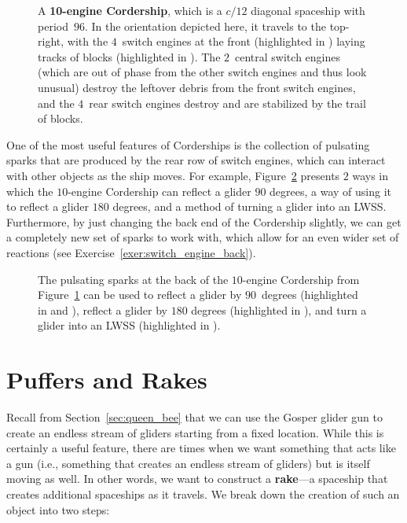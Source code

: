 \begin{figure}[!htb]
	\centering{}
	\caption{A \textbf{10-engine Cordership}, which is a $c/12$ diagonal spaceship with period~$96$. In the orientation depicted here, it travels to the top-right, with the $4$~switch engines at the front (highlighted in ) laying tracks of blocks (highlighted in ). The $2$~central switch engines (which are out of phase from the other switch engines and thus look unusual) destroy the leftover debris from the front switch engines, and the $4$~rear switch engines destroy and are stabilized by the trail of blocks.}\label{fig:10_engine_cordership}
\end{figure}

One of the most useful features of Corderships is the collection of pulsating sparks that are produced by the rear row of switch engines, which can interact with other objects as the ship moves. For example, Figure~\ref{fig:cordership_reflections} presents $2$ ways in which the $10$-engine Cordership can reflect a glider $90$ degrees, a way of using it to reflect a glider $180$ degrees, and a method of turning a glider into an LWSS. Furthermore, by just changing the back end of the Cordership slightly, we can get a completely new set of sparks to work with, which allow for an even wider set of reactions (see Exercise~\ref{exer:switch_engine_back}).

\begin{figure}[!htb]
	\centering{}
	\caption{The pulsating sparks at the back of the $10$-engine Cordership from Figure~\ref{fig:10_engine_cordership} can be used to reflect a glider by $90$~degrees (highlighted in  and ), reflect a glider by $180$ degrees (highlighted in ), and turn a glider into an LWSS (highlighted in ).}\label{fig:cordership_reflections}
\end{figure}


\section{Puffers and Rakes}\label{sec:rakes}

Recall from Section~\ref{sec:queen_bee} that we can use the Gosper glider gun to create an endless stream of gliders starting from a fixed location. While this is certainly a useful feature, there are times when we want something that acts like a gun (i.e., something that creates an endless stream of gliders) but is itself moving as well. In other words, we want to construct a \textbf{rake}---a spaceship that creates additional spaceships as it travels. We break down the creation of such an object into two steps:\smallskip

